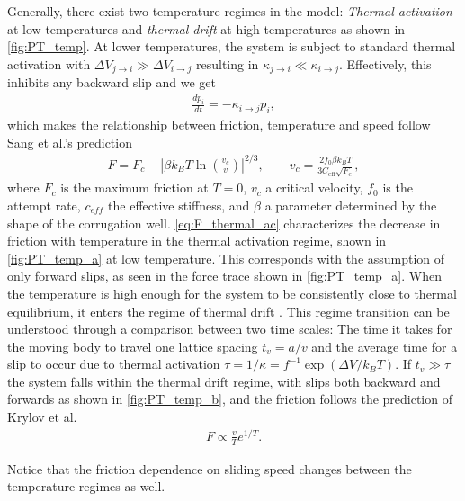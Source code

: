 Generally, there exist two temperature regimes in the model: \textit{Thermal activation} at low temperatures and \textit{thermal drift} at high temperatures as shown in \cref{fig:PT_temp}. At lower temperatures, the system is subject to standard thermal activation with $\Delta V_{j \to i} \gg \Delta V_{i \to j}$ resulting in  $\kappa_{j \to i} \ll \kappa_{i \to j}$. Effectively, this inhibits any backward slip and we get  
\begin{align*}
  \frac{dp_i}{dt} = -\kappa_{i\to j}p_i,
\end{align*}
which makes the relationship between friction, temperature and speed follow Sang et al.’s prediction \cite{Sang_2001}
\begin{align}
  F=F_c-\left|\beta k_B T \ln \left(\frac{v_c}{v}\right)\right|^{2 / 3}, \qquad v_c = \frac{2f_0\beta k_B T}{3 C_{\text{eff}} \sqrt{F_c}},
  \label{eq:F_thermal_ac}
\end{align}
where $F_c$ is the maximum friction at $T = 0$, $v_c$ a critical velocity, $f_0$
is the attempt rate, $c_{eff}$ the effective stiffness, and $\beta$ a
parameter determined by the shape of the corrugation well.
\cref{eq:F_thermal_ac} characterizes the decrease in friction with temperature
in the thermal activation regime, shown in \cref{fig:PT_temp_a} at low temperature. This corresponds with the assumption of only forward slips, as seen in the force trace shown in \cref{fig:PT_temp_a}. When the temperature is high enough for the system to be consistently close to thermal equilibrium, it enters the regime of thermal drift \cite{PhysRevE.71.065101}. This regime transition can be understood through a comparison between two time scales: The time it takes for the moving body to travel one lattice spacing
$t_v = a/v$ and the average time for a slip to occur due to thermal activation
$\tau = 1/\kappa = f^{-1}\exp(\Delta V / k_BT)$. If $t_v \gg \tau$ the system falls within the thermal drift regime, with slips both backward and forwards as shown in \cref{fig:PT_temp_b}, and the friction follows the prediction of Krylov et
al.\ \cite{Krylow_2007, PhysRevE.71.065101, Jinesh_2008}
\begin{align}
  F \propto \frac{v}{T}e^{1/T}.
  \label{eq:PT_thermal_drift}
\end{align}

Notice that the friction dependence on sliding speed changes between the temperature regimes as well.



  

